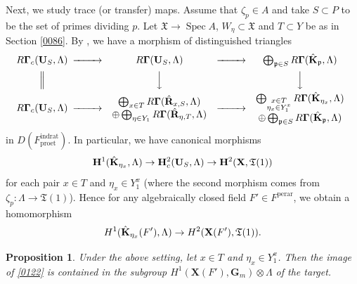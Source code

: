 \documentclass{amsart}
\newtheorem{Prop}[Thm]{Proposition}
\theoremstyle{remark}
\numberwithin{equation}{section}
\newcommand{\tensor}{\mathbin{\otimes}}
\newcommand{\et}{\mathrm{et}}
\newcommand{\Gm}{\mathbf{G}_{m}}
\newcommand{\rat}{\mathrm{rat}}
\newcommand{\ind}{\mathrm{ind}}
\newcommand{\pro}{\mathrm{pro}}
\newcommand{\perar}{\mathrm{perar}}
\newcommand{\alg}[1]{\mathbf{#1}}
\newcommand{\ideal}[1]{\mathfrak{#1}}
\DeclareMathOperator{\Spec}{Spec}
\begin{document}
Next, we study trace (or transfer) maps.
Assume that $\zeta_{p} \in A$
and take $S \subset P$ to be the set of primes dividing $p$.
Let $\mathfrak{X} \to \Spec A$, $W_{\eta} \subset \mathfrak{X}$ and $T \subset Y$
be as in Section \ref{0086}.
By \cite[(10.4.7), (10.5.1)]{Suz24}, we have a morphism of distinguished triangles
	\begin{equation} \label{0087}
		\begin{CD}
				R \alg{\Gamma}_{c}(\alg{U}_{S}, \Lambda)
			@>>>
				R \alg{\Gamma}(\alg{U}_{S}, \Lambda)
			@>>>
				\bigoplus_{\ideal{p} \in S}
					R \alg{\Gamma}(\Hat{\alg{K}}_{\ideal{p}}, \Lambda)
			\\ @| @VVV @VVV \\
				R \alg{\Gamma}_{c}(\alg{U}_{S}, \Lambda)
			@>>>
				\begin{array}{c}
						\bigoplus_{x \in T}
							R \alg{\Gamma}(\Hat{\alg{R}}_{x, S}, \Lambda)
					\\
					\oplus
						\bigoplus_{\eta \in Y_{1}}
							R \alg{\Gamma}(\Hat{\alg{R}}_{\eta, T}, \Lambda)
				\end{array}
			@>>>
				\begin{array}{c}
						\bigoplus_{
							\substack{
								x \in T \\
								\eta_{x} \in Y_{1}^{x}
							}
						}
							R \alg{\Gamma}(\Hat{\alg{K}}_{\eta_{x}}, \Lambda)
					\\
					\oplus
						\bigoplus_{\ideal{p} \in S}
							R \alg{\Gamma}(\Hat{\alg{K}}_{\ideal{p}}, \Lambda)
				\end{array}
		\end{CD}
	\end{equation}
in $D(F^{\ind\rat}_{\pro\et})$.
In particular, we have canonical morphisms
	\begin{equation} \label{0090}
			\alg{H}^{1}(\Hat{\alg{K}}_{\eta_{x}}, \Lambda)
		\to
			\alg{H}^{2}_{c}(\alg{U}_{S}, \Lambda)
		\to
			\alg{H}^{2}(\alg{X}, \mathfrak{T}(1))
	\end{equation}
for each pair $x \in T$ and $\eta_{x} \in Y_{1}^{x}$
(where the second morphism comes from $\zeta_{p} \colon \Lambda \to \mathfrak{T}(1)$).
Hence for any algebraically closed field $F' \in F^{\perar}$,
we obtain a homomorphism
	\begin{equation} \label{0122}
			H^{1}(\Hat{\alg{K}}_{\eta_{x}}(F'), \Lambda)
		\to
			H^{2}(\alg{X}(F'), \mathfrak{T}(1)).
	\end{equation}

\begin{Prop} \label{0066}
	Under the above setting,
	let $x \in T$ and $\eta_{x} \in Y_{1}^{x}$.
	Then the image of \eqref{0122} is contained in the subgroup
	$H^{1}(\alg{X}(F'), \Gm) \tensor \Lambda$
	of the target.
\end{Prop}
\end{document}
